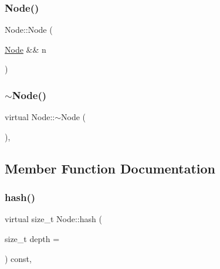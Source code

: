 \mbox{\label{class_node_a87c9938dcd77c169802a732c98204945}} 
\subsubsection{\texorpdfstring{Node()}{Node()}\hspace{0.1cm}{\footnotesize\ttfamily [3/3]}}
{\footnotesize\ttfamily Node\+::\+Node (\begin{DoxyParamCaption}\item[{\hyperlink{class_node}{Node} \&\&}]{n }\end{DoxyParamCaption})\hspace{0.3cm}{\ttfamily [inline]}}

\mbox{\label{class_node_af5e3fa79300bf5f3f2f3ecae6e795a94}} 
\subsubsection{\texorpdfstring{$\sim$\+Node()}{~Node()}}
{\footnotesize\ttfamily virtual Node\+::$\sim$\+Node (\begin{DoxyParamCaption}{ }\end{DoxyParamCaption})\hspace{0.3cm}{\ttfamily [inline]}, {\ttfamily [virtual]}}



\subsection{Member Function Documentation}
\mbox{\label{class_node_a212f2e1ba4ff71de6954b0b791d89979}} 
\subsubsection{\texorpdfstring{hash()}{hash()}}
{\footnotesize\ttfamily virtual size\+\_\+t Node\+::hash (\begin{DoxyParamCaption}\item[{size\+\_\+t}]{depth = {} }\end{DoxyParamCaption}) const\hspace{0.3cm}{\ttfamily [inline]}, {\ttfamily [virtual]}}

